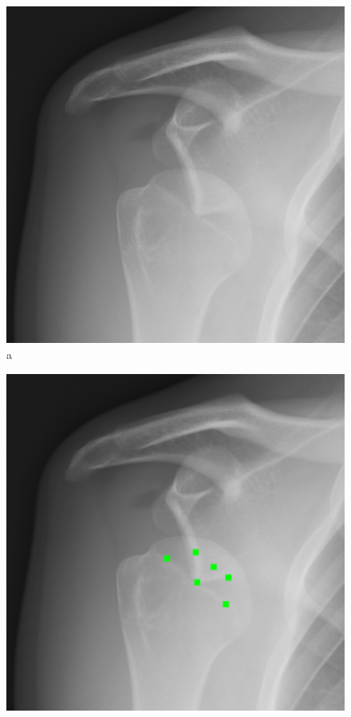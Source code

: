 \documentclass[a4paper,11pt,twoside,openright]{report}
\theoremstyle{definition}
\begin{document}
\begin{figure}[h!]
\begin{center}
	\begin{center}
		\includegraphics[width=1.0\textwidth]{179}
		a
	\end{center}
	\endminipage\hfill
	\begin{center}
		\includegraphics[width=1.0\textwidth]{180}

\end{center}
\end{center}
\end{figure}
\end{document}
